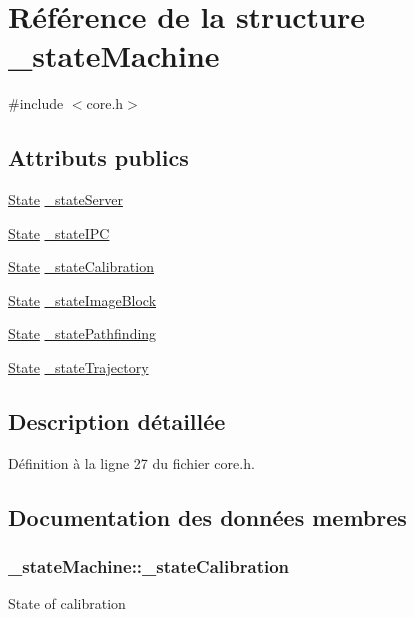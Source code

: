 \hypertarget{struct__state_machine}{\section{Référence de la structure \-\_\-state\-Machine}
\label{struct__state_machine}
}


{\ttfamily \#include $<$core.\-h$>$}

\subsection*{Attributs publics}
\begin{DoxyCompactItemize}
\item 
\hyperlink{core_8h_a5d74787dedbc4e11c1ab15bf487e61f8}{State} \hyperlink{struct__state_machine_aaee24e4ab99a6f1243a46645188de8d0}{\-\_\-state\-Server}
\item 
\hyperlink{core_8h_a5d74787dedbc4e11c1ab15bf487e61f8}{State} \hyperlink{struct__state_machine_aa6cc70d0567b403fb9e993a681f48b85}{\-\_\-state\-I\-P\-C}
\item 
\hyperlink{core_8h_a5d74787dedbc4e11c1ab15bf487e61f8}{State} \hyperlink{struct__state_machine_a157036ced733a021849ebcbc98c27200}{\-\_\-state\-Calibration}
\item 
\hyperlink{core_8h_a5d74787dedbc4e11c1ab15bf487e61f8}{State} \hyperlink{struct__state_machine_adbc0e51d4bed9b6da5c44e921e37dc32}{\-\_\-state\-Image\-Block}
\item 
\hyperlink{core_8h_a5d74787dedbc4e11c1ab15bf487e61f8}{State} \hyperlink{struct__state_machine_a79ce614ae01c3759d155c03026384ca7}{\-\_\-state\-Pathfinding}
\item 
\hyperlink{core_8h_a5d74787dedbc4e11c1ab15bf487e61f8}{State} \hyperlink{struct__state_machine_a88c6e0c15cdd29b3eec2e842fa09b08f}{\-\_\-state\-Trajectory}
\end{DoxyCompactItemize}


\subsection{Description détaillée}


Définition à la ligne 27 du fichier core.\-h.



\subsection{Documentation des données membres}
\hypertarget{struct__state_machine_a157036ced733a021849ebcbc98c27200}{
\subsubsection[{\-\_\-state\-Calibration}]{ \-\_\-state\-Machine\-::\-\_\-state\-Calibration}}\label{struct__state_machine_a157036ced733a021849ebcbc98c27200}
State of calibration 

